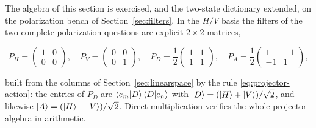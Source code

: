 The algebra of this section is exercised, and the two-state dictionary extended, on the polarization bench of Section~\ref{sec:filters}. In the $H/V$ basis the filters of the two complete polarization questions are explicit $2\times2$ matrices,
\begin{linenomath}
    \begin{equation}
        P_H =
        \begin{pmatrix}
            1 & 0\\
            0 & 0
        \end{pmatrix},\quad
        P_V =
        \begin{pmatrix}
            0 & 0\\
            0 & 1
        \end{pmatrix},\quad
        P_D = \frac12
        \begin{pmatrix}
            1 & 1\\
            1 & 1
        \end{pmatrix},\quad
        P_A = \frac12
        \begin{pmatrix}
            1 & -1\\
            -1 & 1
        \end{pmatrix},
    \end{equation}
\end{linenomath}
built from the columns of Section~\ref{sec:linearspace} by the rule \eqref{eq:projector-action}: the entries of $P_D$ are $\braket{e_m|D}\braket{D|e_n}$ with $\ket{D} = (\ket{H}+\ket{V})/\sqrt{2}$, and likewise $\ket{A} = (\ket{H}-\ket{V})/\sqrt{2}$. Direct multiplication verifies the whole projector algebra in arithmetic.
